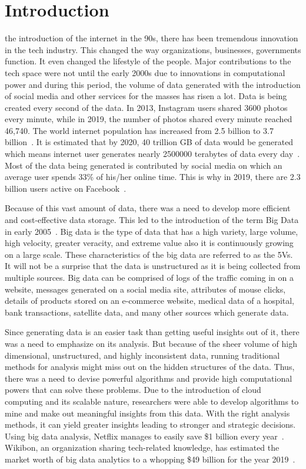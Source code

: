 \documentclass[journal,twoside,web]{ieeecolor}
\begin{document}
\section{Introduction}
\label{sec:introduction}
 the introduction of the internet in the 90s, there has been tremendous innovation in the tech industry. This changed the way organizations, businesses, governments function. It even changed the lifestyle of the people. Major contributions to the tech space were not until the early 2000s due to innovations in computational power and during this period, the volume of data generated with the introduction of social media and other services for the masses has risen a lot. Data is being created every second of the data. In 2013, Instagram users shared 3600 photos every minute, while in 2019, the number of photos shared every minute reached 46,740. The world internet population has increased from 2.5 billion to 3.7 billion~\cite{1}. It is estimated that by 2020, 40 trillion GB of data would be generated~\cite{2} which means internet user generates nearly 2500000 terabytes of data every day~\cite{1}. Most of the data being generated is contributed by social media on which an average user spends 33\% of his/her online time. This is why in 2019, there are 2.3 billion users active on Facebook~\cite{3}.

Because of this vast amount of data, there was a need to develop more efficient and cost-effective data storage. This led to the introduction of the term Big Data in early 2005~\cite{4}. Big data is the type of data that has a high variety, large volume, high velocity, greater veracity, and extreme value also it is continuously growing on a large scale. These characteristics of the big data are referred to as the 5Vs. It will not be a surprise that the data is unstructured as it is being collected from multiple sources. Big data can be comprised of logs of the traffic coming in on a website, messages generated on a social media site, attributes of mouse clicks, details of products stored on an e-commerce website, medical data of a hospital, bank transactions, satellite data, and many other sources which generate data.

Since generating data is an easier task than getting useful insights out of it, there was a need to emphasize on its analysis. But because of the sheer volume of high dimensional, unstructured, and highly inconsistent data, running traditional methods for analysis might miss out on the hidden structures of the data. Thus, there was a need to devise powerful algorithms and provide high computational powers that can solve these problems. Due to the introduction of cloud computing and its scalable nature, researchers were able to develop algorithms to mine and make out meaningful insights from this data. With the right analysis methods, it can yield greater insights leading to stronger and strategic decisions. Using big data analysis, Netflix manages to easily save \$1 billion every year~\cite{5}. Wikibon, an organization sharing tech-related knowledge, has estimated the market worth of big data analytics to a whopping \$49 billion for the year 2019~\cite{6}.
\end{document}
